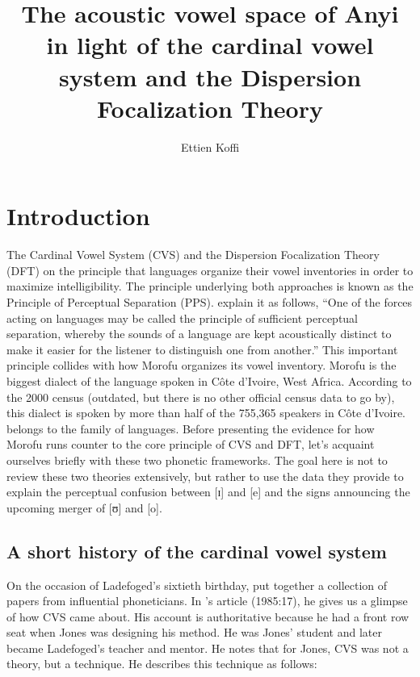\documentclass[output=paper,
modfonts
]{langscibook}
\title{The acoustic vowel space of Anyi in light of the cardinal vowel system and the Dispersion Focalization Theory}
\author{Ettien Koffi \affiliation{St. Cloud State University}}
\begin{document}
\maketitle 

\section{Introduction} 
\largerpage
The Cardinal Vowel System (CVS) and the Dispersion Focalization Theory (DFT)  on the principle that languages organize their vowel inventories in order to maximize intelligibility. The principle underlying both approaches is known as the Principle of Perceptual Separation (PPS). \citet[238]{LadefogedJohnson2015} explain it as follows, “One of the forces acting on languages may be called the principle of sufficient perceptual separation, whereby the sounds of a language are kept acoustically distinct to make it easier for the listener to distinguish one from another.” This important principle collides with how  Morofu organizes its vowel inventory.  Morofu is the biggest dialect of the  language spoken in Côte d’Ivoire, West Africa. According to the 2000 census (outdated, but there is no other official census data to go by), this dialect is spoken by more than half of the 755,365  speakers in Côte d’Ivoire.  belongs to the  family of languages. Before presenting the evidence for how  Morofu runs counter to the core principle of CVS and DFT, let’s acquaint ourselves briefly with these two phonetic frameworks. The goal here is not to review these two theories extensively, but rather to use the data they provide to explain the perceptual confusion between [ɪ] and [e] and the signs announcing the upcoming merger of [ʊ] and [o]. 

\subsection{A short history of the cardinal vowel system}
\largerpage
On the occasion of Ladefoged’s sixtieth birthday, \citet{Fromkin1985} put together a collection of papers from influential phoneticians. In \citeauthor{Abercrombie1985}’s article (1985:17), he gives us a glimpse of how CVS came about. His account is authoritative because he had a front row seat when Jones was designing his method. He was Jones’ student and later became Ladefoged’s teacher and mentor. He notes that for Jones, CVS was not a theory, but a technique. He describes this technique as follows: 
\end{document}
